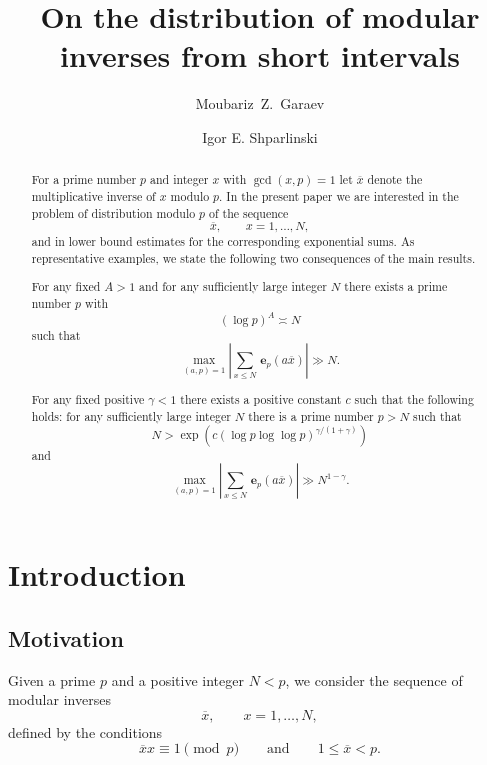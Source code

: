 \documentclass[12pt]{amsart}
\numberwithin{equation}{section}
\numberwithin{theorem}{section}
\numberwithin{table}{section}
\numberwithin{figure}{section}
\def\le{\leqslant}
\def\e{\mathbf{e}}
\def\xbar{\overline{x}}
\def\mand{\qquad\mbox{and}\qquad}
\def\({\left(}
\def\){\right)}
\def\e{{\mathbf{\,e}}}
\begin{document}
\title[Modular inverses from short intervals]
{On the distribution of modular inverses from short intervals}

\author{Moubariz~Z.~Garaev}
\address{Centro  de Ciencias Matem{\'a}ticas,  Universidad Nacional Aut\'onoma de
M{\'e}\-xico, C.P. 58089, Morelia, Michoac{\'a}n, M{\'e}xico}

\author[I. E. Shparlinski] {Igor E. Shparlinski}
\address{School of Mathematics and Statistics, University of New South Wales, Sydney, NSW 2052, Australia}



\begin{abstract}  
For a prime number $p$ and integer $x$ with $\gcd(x,p)=1$ let $\xbar$ denote the multiplicative inverse
of $x$ modulo $p.$ In the present paper we are interested in the problem of distribution
modulo $p$ of the sequence
$$
\xbar, \qquad x =1, \ldots, N, 
$$
and in lower bound estimates for the corresponding exponential sums. As representative examples, we state the following two consequences of the main results. 

For  any fixed  $A > 1$ and for any sufficiently large integer $N$ there exists a prime number $p$ with
$$
(\log p)^A \asymp N
$$
such that   
$$
\max_{(a,p)=1}\left|\sum_{x\le N}\e_p(a\xbar)\right|\gg N. 
$$ 


For any fixed positive  $\gamma< 1$  
there exists a positive constant $c$  such that the following holds: for any sufficiently large integer $N$ there is a prime number $p > N$ such that  
$$
N > \exp\(c(\log p\log\log p)^{\gamma/(1+\gamma)}\)
$$
and 
$$
\max_{(a,p)=1}\left|\sum_{x\le N}\e_p\(a \xbar\)\right|\gg N^{1-\gamma}.
$$
\end{abstract} 



\maketitle

\tableofcontents
\section{Introduction}

\subsection{Motivation} 
Given a prime $p$ and a positive integer $N < p$, we consider 
the sequence of modular inverses 
\begin{equation}
\label{eq: x-bar}
\xbar, \qquad x =1, \ldots, N,
\end{equation}
defined by the conditions
$$
\xbar x \equiv 1 \pmod p \mand 1 \le \xbar < p. 
$$
\end{document}
